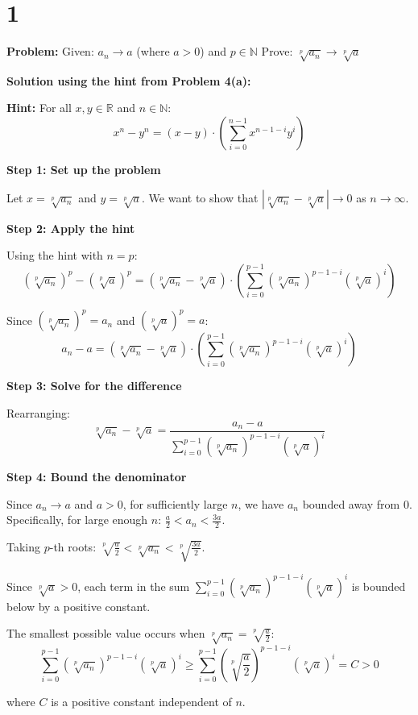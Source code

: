 \documentclass[12pt,a4paper]{article}
\theoremstyle{definition}
\theoremstyle{remark}
\begin{document}
\section*{1}


\textbf{Problem:} Given: $a_n \to a$ (where $a > 0$) and $p \in \mathbb{N}$
Prove: $\sqrt[p]{a_n} \to \sqrt[p]{a}$

\textbf{Solution using the hint from Problem 4(a):}

\textbf{Hint:} For all $x, y \in \mathbb{R}$ and $n \in \mathbb{N}$:
$$x^n - y^n = (x - y) \cdot \left(\sum_{i=0}^{n-1} x^{n-1-i}y^i\right)$$

\textbf{Step 1: Set up the problem}

Let $x = \sqrt[p]{a_n}$ and $y = \sqrt[p]{a}$. We want to show that $|\sqrt[p]{a_n} - \sqrt[p]{a}| \to 0$ as $n \to \infty$.

\textbf{Step 2: Apply the hint}

Using the hint with $n = p$:
$$(\sqrt[p]{a_n})^p - (\sqrt[p]{a})^p = (\sqrt[p]{a_n} - \sqrt[p]{a}) \cdot \left(\sum_{i=0}^{p-1} (\sqrt[p]{a_n})^{p-1-i}(\sqrt[p]{a})^i\right)$$

Since $(\sqrt[p]{a_n})^p = a_n$ and $(\sqrt[p]{a})^p = a$:
$$a_n - a = (\sqrt[p]{a_n} - \sqrt[p]{a}) \cdot \left(\sum_{i=0}^{p-1} (\sqrt[p]{a_n})^{p-1-i}(\sqrt[p]{a})^i\right)$$

\textbf{Step 3: Solve for the difference}

Rearranging:
$$\sqrt[p]{a_n} - \sqrt[p]{a} = \frac{a_n - a}{\sum_{i=0}^{p-1} (\sqrt[p]{a_n})^{p-1-i}(\sqrt[p]{a})^i}$$

\textbf{Step 4: Bound the denominator}

Since $a_n \to a$ and $a > 0$, for sufficiently large $n$, we have $a_n$ bounded away from 0. 
Specifically, for large enough $n$: $\frac{a}{2} < a_n < \frac{3a}{2}$.

Taking $p$-th roots: $\sqrt[p]{\frac{a}{2}} < \sqrt[p]{a_n} < \sqrt[p]{\frac{3a}{2}}$.

Since $\sqrt[p]{a} > 0$, each term in the sum $\sum_{i=0}^{p-1} (\sqrt[p]{a_n})^{p-1-i}(\sqrt[p]{a})^i$ is bounded below by a positive constant.

The smallest possible value occurs when $\sqrt[p]{a_n} = \sqrt[p]{\frac{a}{2}}$:
$$\sum_{i=0}^{p-1} (\sqrt[p]{a_n})^{p-1-i}(\sqrt[p]{a})^i \geq \sum_{i=0}^{p-1} \left(\sqrt[p]{\frac{a}{2}}\right)^{p-1-i}(\sqrt[p]{a})^i = C > 0$$

where $C$ is a positive constant independent of $n$.
\end{document}
